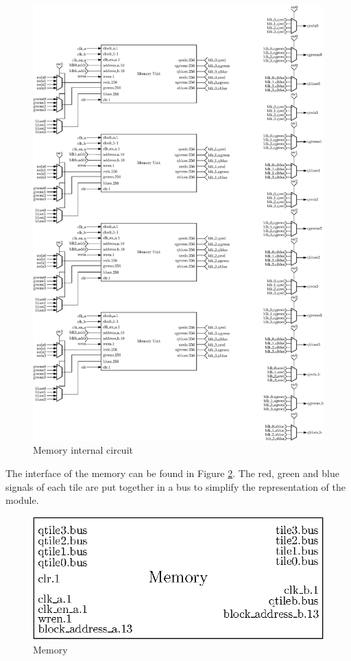 \begin{figure}[H]
    \centering
    \includegraphics[scale=0.55]{Chapter4-GPU_CLKU/res/memory_in_part1}
    \caption{Memory internal circuit}
    \label{fig:gpu/memory_in}
\end{figure}

The interface of the memory can be found in Figure \ref{fig:gpu/memory}. 
The red, green and blue signals of each tile 
are put together in a bus to simplify the representation of the module.

\begin{figure}[H]
    \centering
    \includegraphics[scale=1.0]{Chapter4-GPU_CLKU/res/memory}
    \caption{Memory}
    \label{fig:gpu/memory}
\end{figure}

